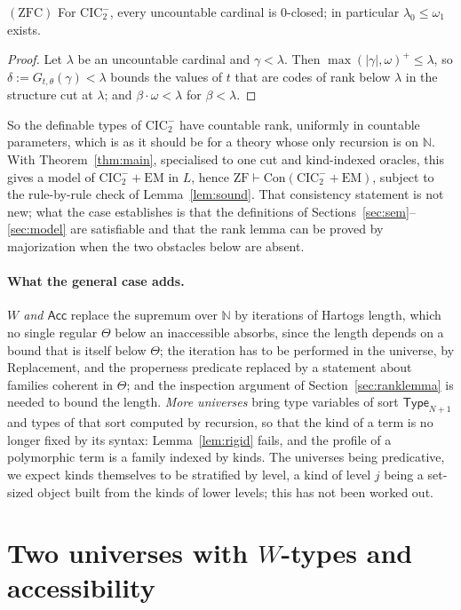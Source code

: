 \documentclass[10pt]{article}
\newcommand{\N}{\mathbb{N}}
\newcommand{\Type}{\mathsf{Type}}
\newcommand{\CIC}{\mathrm{CIC}}
\newcommand{\ZF}{\mathrm{ZF}}
\newcommand{\ZFC}{\mathrm{ZFC}}
\newcommand{\EM}{\mathrm{EM}}
\newcommand{\Con}{\mathrm{Con}}
\newcommand{\Acc}{\mathsf{Acc}}
\begin{document}
\begin{corollary}\label{cor:omega1}
$(\ZFC)$ For $\CIC_2^-$, every uncountable cardinal is $0$-closed; in
particular $\lambda_0\le\omega_1$ exists.
\end{corollary}
\begin{proof}
Let $\lambda$ be an uncountable cardinal and $\gamma<\lambda$. Then
$\max(|\gamma|,\omega)^+\le\lambda$, so
$\delta:=G_{t,\theta}(\gamma)<\lambda$ bounds the values of $t$ that are
codes of rank below $\lambda$ in the structure cut at $\lambda$; and
$\beta\cdot\omega<\lambda$ for $\beta<\lambda$.
\end{proof}

So the definable types of $\CIC_2^-$ have countable rank, uniformly in
countable parameters, which is as it should be for a theory whose only
recursion is on $\N$. With Theorem~\ref{thm:main}, specialised to one
cut and kind-indexed oracles, this gives a model of $\CIC_2^-+\EM$ in
$L$, hence $\ZF\vdash\Con(\CIC_2^-+\EM)$, subject to the rule-by-rule check
of Lemma~\ref{lem:sound}. That consistency statement is not new; what
the case establishes is that the definitions of
Sections~\ref{sec:sem}--\ref{sec:model} are satisfiable and that the
rank lemma can be proved by majorization when the two obstacles below
are absent.

\paragraph{What the general case adds.}
\emph{$W$ and $\Acc$} replace the supremum over $\N$ by iterations of
Hartogs length, which no single regular $\Theta$ below an inaccessible
absorbs, since the length depends on a bound that is itself below
$\Theta$; the iteration has to be performed in the universe, by
Replacement, and the properness predicate replaced by a statement about
families coherent in $\Theta$; and the inspection argument of
Section~\ref{sec:ranklemma} is needed to bound the length.
\emph{More universes} bring type variables of sort $\Type_{N+1}$ and
types of that sort computed by recursion, so that the kind of a term is
no longer fixed by its syntax: Lemma~\ref{lem:rigid} fails, and the
profile of a polymorphic term is a family indexed by kinds. The
universes being predicative, we expect kinds themselves to be
stratified by level, a kind of level $j$ being a set-sized object built
from the kinds of lower levels; this has not been worked out.

\section{Two universes with $W$-types and accessibility}\label{sec:cic2}
\end{document}
